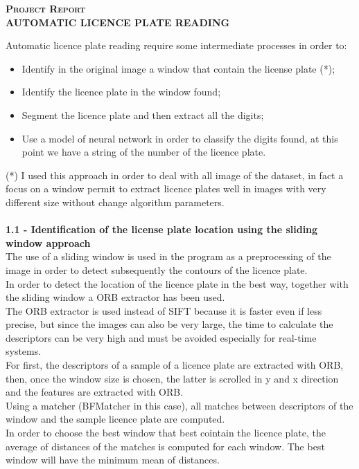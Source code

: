 \documentclass[11pt]{article}
\begin{document}
\begin{titlepage}
\begin{center}
\textsc{\huge \textbf{Project Report}} \\
[3mm]
\textsc{\large \textbf{AUTOMATIC LICENCE PLATE READING}} \\
[5mm]
\end{center} 
{ 
Automatic licence plate reading require some intermediate processes in order to:
\begin{itemize}
\item Identify in the original image a window that contain the license plate (*);
\item Identify the licence plate in the window found;
\item Segment the licence plate and then extract all the digits;
\item Use a model of neural network in order to classify the digits found, at this point we have a string of the number of the licence plate.
\end{itemize}
(*) I used this approach in order to deal with all image of the dataset, in fact a focus on a window permit to extract licence plates well in images with very different size without change algorithm parameters.\\\\
\textbf{\large{1.1 - Identification of the license plate location using the sliding window approach}} \\
[1 mm]
The use of a sliding window is used in the program as a preprocessing of the image in order to detect subsequently the contours of the licence plate.
\\In order to detect the location of the licence plate in the best way, together with the sliding window a ORB extractor has been used. 
\\ The ORB extractor is used instead of SIFT because it is faster even if less precise, but since the images can also be very large, the time to calculate the descriptors can be very high and must be avoided especially for real-time systems.
\\ For first, the descriptors of a sample of a licence plate are extracted with ORB, then, once the window size is chosen, the latter is scrolled in y and x direction and the features are extracted with ORB.
\\ Using a matcher (BFMatcher in this case), all matches between descriptors of the window and the sample licence plate are computed. 
\\ In order to choose the best window that best cointain the licence plate, the average of distances of the matches is computed for each window. The best window will have the minimum mean of distances.
}
\end{titlepage}
\end{document}
